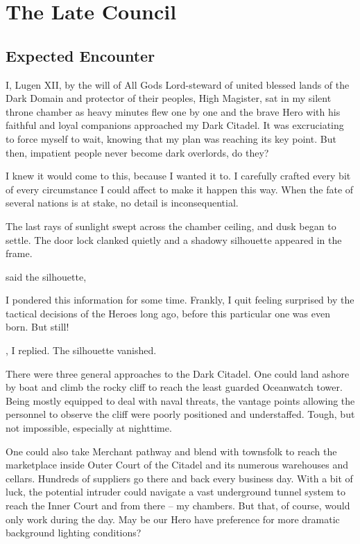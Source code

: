 \chapter{The Late Council}

\section{Expected Encounter}

I, Lugen XII, by the will of All Gods Lord-steward of united blessed lands of the Dark Domain and protector of their peoples, High Magister, sat in my silent throne chamber as heavy minutes flew one by one and the brave Hero with his faithful and loyal companions approached my Dark Citadel. It was excruciating to force myself to wait, knowing that my plan was reaching its key point. But then, impatient people never become dark overlords, do they?

I knew it would come to this, because I wanted it to. I carefully crafted every bit of every circumstance I could affect to make it happen this way. When the fate of several nations is at stake, no detail is inconsequential.

The last rays of sunlight swept across the chamber ceiling, and dusk began to settle. The door lock clanked quietly and a shadowy silhouette appeared in the frame.

 said the silhouette, 

I pondered this information for some time. Frankly, I quit feeling surprised by the tactical decisions of the Heroes long ago, before this particular one was even born. But still!

, I replied.  The silhouette vanished.

There were three general approaches to the Dark Citadel. One could land ashore by boat and climb the rocky cliff to reach the least guarded Oceanwatch tower. Being mostly equipped to deal with naval threats, the vantage points allowing the personnel to observe the cliff were poorly positioned and understaffed. Tough, but not impossible, especially at nighttime.

One could also take Merchant pathway and blend with townsfolk to reach the marketplace inside Outer Court of the Citadel and its numerous warehouses and cellars. Hundreds of suppliers go there and back every business day. With a bit of luck, the potential intruder could navigate a vast underground tunnel system to reach the Inner Court and from there -- my chambers. But that, of course, would only work during the day. May be our Hero have preference for more dramatic background lighting conditions?

